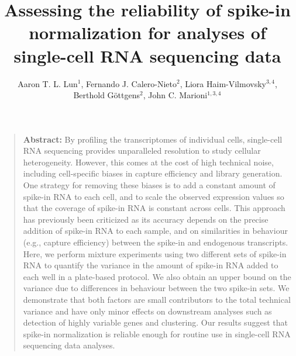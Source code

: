 \documentclass{article}
\title{Assessing the reliability of spike-in normalization for analyses of single-cell RNA sequencing data}
\author{Aaron T. L. Lun$^1$, Fernando J. Calero-Nieto$^2$, Liora Haim-Vilmovsky$^{3,4}$, \\ Berthold G\"ottgens$^2$, John C. Marioni$^{1,3,4}$}
\date{
    \begin{minipage}{0.9\textwidth}
        \begin{flushleft} 
            \begin{small}
                $^1$Cancer Research UK Cambridge Institute, University of Cambridge, Li Ka Shing Centre, Robinson Way, Cambridge CB2 0RE, United Kingdom \\
                $^2$Wellcome Trust and MRC Cambridge Stem Cell Institute, University of Cambridge, Wellcome Trust/MRC Building, Hills Road, Cambridge CB2 0XY, United Kingdom \\
                $^3$EMBL European Bioinformatics Institute, Wellcome Genome Campus, Hinxton, Cambridge CB10 1SD, United Kingdom \\
                $^4$Wellcome Trust Sanger Institute, Wellcome Genome Campus, Hinxton, Cambridge CB10 1SA, United Kingdom \\
            \end{small}
        \end{flushleft}
    \end{minipage}\\[0.2in]
    \today{}
}
\begin{document}
\maketitle

\begin{quote}
\textbf{Abstract:}
By profiling the transcriptomes of individual cells, single-cell RNA sequencing provides unparalleled resolution to study cellular heterogeneity.
However, this comes at the cost of high technical noise, including cell-specific biases in capture efficiency and library generation.
One strategy for removing these biases is to add a constant amount of spike-in RNA to each cell, and to scale the observed expression values so that the coverage of spike-in RNA is constant across cells.
This approach has previously been criticized as its accuracy depends on the precise addition of spike-in RNA to each sample, and on similarities in behaviour (e.g., capture efficiency) between the spike-in and endogenous transcripts.
Here, we perform mixture experiments using two different sets of spike-in RNA to quantify the variance in the amount of spike-in RNA added to each well in a plate-based protocol.
We also obtain an upper bound on the variance due to differences in behaviour between the two spike-in sets.
We demonstrate that both factors are small contributors to the total technical variance and have only minor effects on downstream analyses such as detection of highly variable genes and clustering.
Our results suggest that spike-in normalization is reliable enough for routine use in single-cell RNA sequencing data analyses.
\end{quote}
\end{document}
